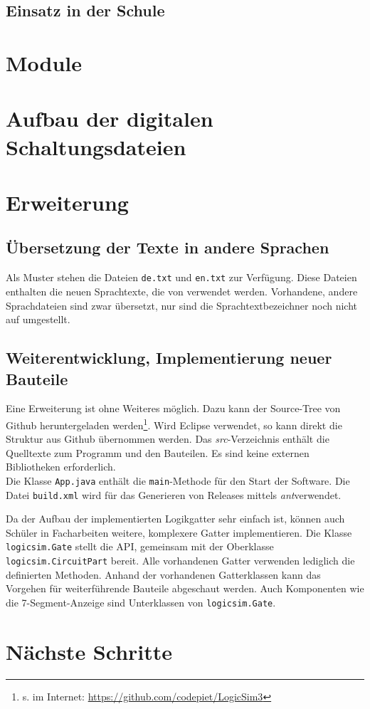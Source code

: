 \documentclass[12pt]{scrartcl}
\begin{document}
\subsection{Einsatz in der Schule}
\section{Module}
\section{Aufbau der digitalen Schaltungsdateien}
\section{Erweiterung}
\subsection{Übersetzung der Texte in andere Sprachen}
Als Muster stehen die Dateien \texttt{de.txt} und \texttt{en.txt} zur Verfügung. Diese Dateien enthalten die neuen Sprachtexte, die von \lsN{} verwendet werden. Vorhandene, andere Sprachdateien sind zwar übersetzt, nur sind die Sprachtextbezeichner noch nicht auf \lsN{} umgestellt.

\subsection{Weiterentwicklung, Implementierung neuer Bauteile}
Eine Erweiterung ist ohne Weiteres möglich. Dazu kann der Source-Tree von Github heruntergeladen werden\footnote{s. im Internet: \url{https://github.com/codepiet/LogicSim3}}. Wird Eclipse verwendet, so kann direkt die Struktur aus Github übernommen werden. Das \textit{src}-Verzeichnis enthält die Quelltexte zum Programm und den Bauteilen. Es sind keine externen Bibliotheken erforderlich.\\

Die Klasse \texttt{App.java} enthält die \texttt{main}-Methode für den Start der Software.
Die Datei \texttt{build.xml} wird für das Generieren von Releases mittels \textit{ant}verwendet.

Da der Aufbau der implementierten Logikgatter sehr einfach ist, können auch Schüler in Facharbeiten weitere, komplexere Gatter implementieren. Die Klasse \texttt{logicsim.Gate} stellt die API, gemeinsam mit der Oberklasse \texttt{logicsim.CircuitPart} bereit. Alle vorhandenen Gatter verwenden lediglich die definierten Methoden. Anhand der vorhandenen Gatterklassen kann das Vorgehen für weiterführende Bauteile abgeschaut werden. Auch Komponenten wie die 7-Segment-Anzeige sind Unterklassen von \texttt{logicsim.Gate}.\\

\section{Nächste Schritte}
\end{document}
